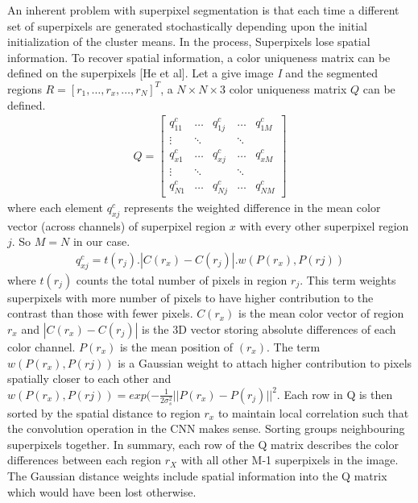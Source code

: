\documentclass[journal]{IEEEtran}
\begin{document}
{An inherent problem with superpixel segmentation is that each time a different set of superpixels are generated stochastically depending upon the initial initialization of the cluster means. In the process, Superpixels lose spatial information. To recover spatial information, a color uniqueness matrix can be defined on the superpixels [He et al]. Let a give image \textit{I} and the segmented regions $ R = [r_1, \dots, r_x, \dots, r_N]^T $, a $N\times N\times 3$ color uniqueness matrix $Q$ can be defined. \\
\begin{align*}
Q = \begin{bmatrix}
q_{11}^c&\dots&q_{1j}^c&\dots&q_{1M}^c\\
\vdots&\ddots&&\ddots&\\
q_{x1}^c&\dots&q_{xj}^c&\dots&q_{xM}^c\\
\vdots&\ddots&&\ddots&\\
q_{N1}^c&\dots&q_{Nj}^c&\dots&q_{NM}^c
\end{bmatrix}
\end{align*}
where each element $q_{xj}^c$ represents the weighted difference in the mean color vector (across channels) of superpixel region $x$ with every other superpixel region $j$. So $M=N$ in our case.
\begin{align*}
q_{xj}^c = t(r_j).|C(r_x)-C(r_j)|.w(P(r_x),P(rj))
\end{align*}
where $t(r_j)$ counts the total number of pixels in region $r_j$. This term weights superpixels with more number of pixels to have higher contribution to the contrast than those with fewer pixels. $C(r_x)$ is the mean color vector of region $r_x$ and $|C(r_x)-C(r_j)|$ is the 3D vector storing absolute differences of each color channel. $P(r_x)$ is the mean position of $(r_x)$. The term $w(P(r_x),P(rj))$ is a Gaussian weight to attach higher contribution to pixels spatially closer to each other and $w(P(r_x),P(rj)) = exp(-\frac{1}{2\sigma_s^2}||P(r_x)-P(r_j)||^2$. Each row in Q is then sorted by the spatial distance to region $r_x$ to maintain local correlation such that the convolution operation in the CNN makes sense. Sorting groups neighbouring superpixels together. In summary, each row of the Q matrix describes the color differences between each region $r_X$ with all other M-1 superpixels in the image. The Gaussian distance weights include spatial information into the Q matrix which would have been lost otherwise. 

}
\end{document}
